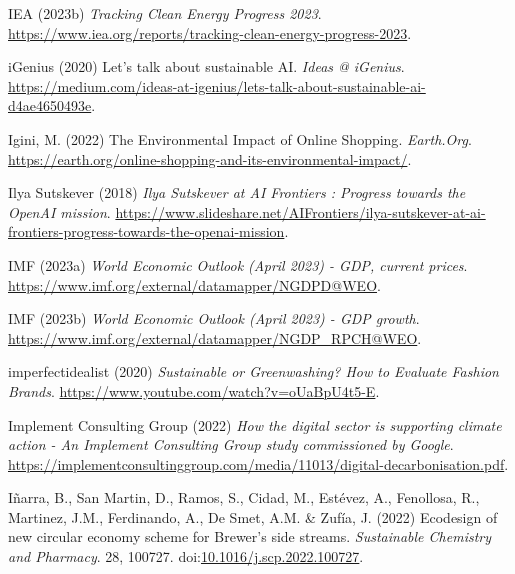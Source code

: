 \documentclass[
  letterpaper,
  DIV=11,
  numbers=noendperiod]{scrartcl}
\newlength{\cslhangindent}
\newenvironment{CSLReferences}[2] %
 {\begin{list}{}{%
  \setlength{\itemindent}{0pt}
  \setlength{\leftmargin}{0pt}
  \setlength{\parsep}{0pt}
  \ifodd #1
   \setlength{\leftmargin}{\cslhangindent}
   \setlength{\itemindent}{-1\cslhangindent}
  \fi
  \setlength{\itemsep}{#2\baselineskip}}}
 {\end{list}}
\begin{document}
\begin{CSLReferences}{0}{1}
IEA (2023b) \emph{Tracking {Clean Energy Progress} 2023}.
\url{https://www.iea.org/reports/tracking-clean-energy-progress-2023}.

iGenius (2020) Let's talk about sustainable {AI}. \emph{Ideas @
iGenius}.
\url{https://medium.com/ideas-at-igenius/lets-talk-about-sustainable-ai-d4ae4650493e}.

Igini, M. (2022) The {Environmental Impact} of {Online Shopping}.
\emph{Earth.Org}.
\url{https://earth.org/online-shopping-and-its-environmental-impact/}.

Ilya Sutskever (2018) \emph{Ilya {Sutskever} at {AI Frontiers} :
{Progress} towards the {OpenAI} mission}.
\url{https://www.slideshare.net/AIFrontiers/ilya-sutskever-at-ai-frontiers-progress-towards-the-openai-mission}.

IMF (2023a) \emph{World {Economic Outlook} ({April} 2023) - {GDP},
current prices}.
\url{https://www.imf.org/external/datamapper/NGDPD@WEO}.

IMF (2023b) \emph{World {Economic Outlook} ({April} 2023) - {GDP}
growth}. \url{https://www.imf.org/external/datamapper/NGDP_RPCH@WEO}.

imperfectidealist (2020) \emph{Sustainable or {Greenwashing}? {How} to
{Evaluate Fashion Brands}}.
\url{https://www.youtube.com/watch?v=oUaBpU4t5-E}.

Implement Consulting Group (2022) \emph{How the digital sector is
supporting climate action - {An Implement Consulting Group} study
commissioned by {Google}}.
\url{https://implementconsultinggroup.com/media/11013/digital-decarbonisation.pdf}.

Iñarra, B., San Martin, D., Ramos, S., Cidad, M., Estévez, A.,
Fenollosa, R., Martinez, J.M., Ferdinando, A., De Smet, A.M. \& Zufía,
J. (2022) Ecodesign of new circular economy scheme for {Brewer}'s side
streams. \emph{Sustainable Chemistry and Pharmacy}. 28, 100727.
doi:\href{https://doi.org/10.1016/j.scp.2022.100727}{10.1016/j.scp.2022.100727}.


\end{CSLReferences}
\end{document}
